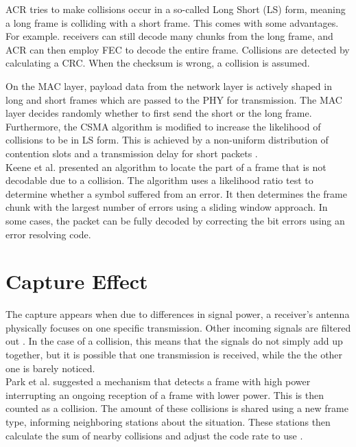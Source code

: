 \gls{ACR} \cite{wu2010} tries to make collisions occur in a so-called Long Short (LS) form, meaning a long frame is colliding with a short frame. This comes with some advantages. For example. receivers can still decode many chunks from the long frame, and \gls{ACR} can then employ \gls{FEC} to decode the entire frame. Collisions are detected by calculating a \gls{CRC}. When the checksum is wrong, a collision is assumed.

On the \gls{MAC} layer, payload data from the network layer is actively shaped in long and short frames which are passed to the \gls{PHY} for transmission. The \gls{MAC} layer decides randomly whether to first send the short or the long frame. Furthermore, the \gls{CSMA} algorithm is modified to increase the likelihood of collisions to be in LS form. This is achieved by a non-uniform distribution of contention slots and a transmission delay for short packets \cite{wu2010}.\\

Keene et al. \cite{keene2010} presented an algorithm to locate the part of a frame that is not decodable due to a collision. The algorithm uses a likelihood ratio test to determine whether a symbol suffered from an error. It then determines the frame chunk with the largest number of errors using a sliding window approach. In some cases, the packet can be fully decoded by correcting the bit errors using an error resolving code.



\section{Capture Effect}\label{sec:related-capture}

The capture appears when due to differences in signal power, a receiver's antenna physically focuses on one specific transmission. Other incoming signals are filtered out \cite{kim1999}. In the case of a collision, this means that the signals do not simply add up together, but it is possible that one transmission is received, while the the other one is barely noticed.\\

Park et al. suggested a mechanism that detects a frame with high power interrupting an ongoing reception of a frame with lower power. This is then counted as a collision. The amount of these collisions is shared using a new frame type, informing neighboring stations about the situation. These stations then calculate the sum of nearby collisions and adjust the code rate to use \cite{park2009}.\\

